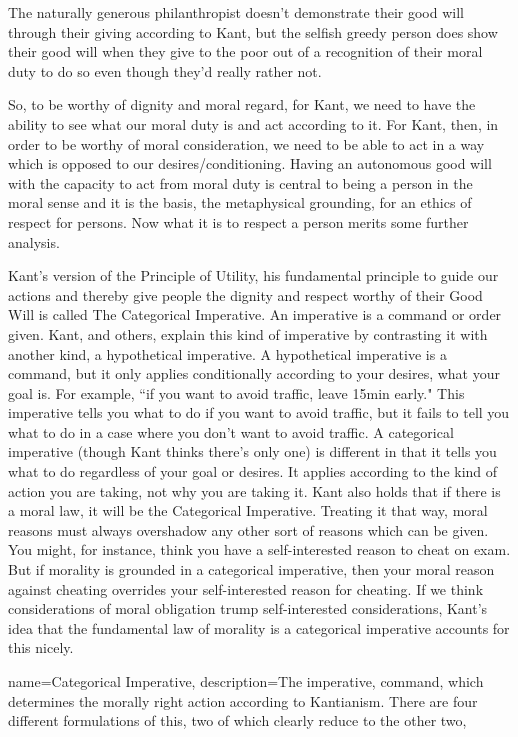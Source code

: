 The naturally generous philanthropist doesn’t demonstrate their good will through their giving according to Kant, but the selfish greedy person does show their good will when they give to the poor out of a recognition of their moral duty to do so even though they’d really rather not.

So, to be worthy of dignity and moral regard, for Kant, we need to have the ability to see what our moral duty is and act according to it. For Kant, then, in order to be worthy of moral consideration, we need to be able to act in a way which is opposed to our desires/conditioning. Having an autonomous good will with the capacity to act from moral duty is central to being a person in the moral sense and it is the basis, the metaphysical grounding, for an ethics of respect for persons. Now what it is to respect a person merits some further analysis.

Kant's version of the Principle of Utility, his fundamental principle to guide our actions and thereby give people the dignity and respect worthy of their Good Will is called The \gls{Categorical Imperative}. An imperative is a command or order given. Kant, and others, explain this kind of imperative by contrasting it with another kind, a hypothetical imperative. A hypothetical imperative is a command, but it only applies conditionally according to your desires, what your goal is. For example, ``if you want to avoid traffic, leave 15min early." This imperative tells you what to do if you want to avoid traffic, but it fails to tell you what to do in a case where you don't want to avoid traffic. A categorical imperative (though Kant thinks there's only one) is different in that it tells you what to do regardless of your goal or desires. It applies according to the kind of action you are taking, not why you are taking it. Kant also holds that if there is a moral law, it will be the Categorical Imperative. Treating it that way, moral reasons must always overshadow any other sort of reasons which can be given. You might, for instance, think you have a self-interested reason to cheat on exam. But if morality is grounded in a categorical imperative, then your moral reason against cheating overrides your self-interested reason for cheating. If we think considerations of moral obligation trump self-interested considerations, Kant’s idea that the fundamental law of morality is a categorical imperative accounts for this nicely.

{
  name=Categorical Imperative,
  description={The imperative, command, which determines the morally right action according to Kantianism. There are four different formulations of this, two of which clearly reduce to the other two},
}


